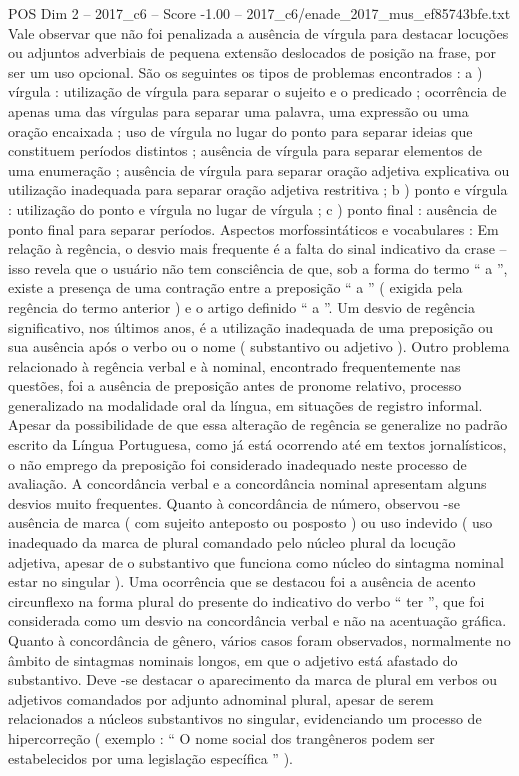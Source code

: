 \begin{textsample}{POS Dim 2 – 2017\_c6 – Score -1.00 – 2017\_c6/enade\_2017\_mus\_ef85743bfe.txt}
Vale observar que não foi penalizada a ausência de vírgula para destacar locuções ou adjuntos adverbiais de pequena extensão deslocados de posição na frase, por ser um uso opcional.
São os seguintes os tipos de problemas encontrados : a ) vírgula : utilização de vírgula para separar o sujeito e o predicado ; ocorrência de apenas uma das vírgulas para separar uma palavra, uma expressão ou uma oração encaixada ; uso de vírgula no lugar do ponto para separar ideias que constituem períodos distintos ; ausência de vírgula para separar elementos de uma enumeração ; ausência de vírgula para separar oração adjetiva explicativa ou utilização inadequada para separar oração adjetiva restritiva ; b ) ponto e vírgula : utilização do ponto e vírgula no lugar de vírgula ; c ) ponto final : ausência de ponto final para separar períodos.
Aspectos morfossintáticos e vocabulares : Em relação à regência, o desvio mais frequente é a falta do sinal indicativo da crase – isso revela que o usuário não tem consciência de que, sob a forma do termo “ a ”, existe a presença de uma contração entre a preposição “ a ” ( exigida pela regência do termo anterior ) e o artigo definido “ a ”.
Um desvio de regência significativo, nos últimos anos, é a utilização inadequada de uma preposição ou sua ausência após o verbo ou o nome ( substantivo ou adjetivo ).
Outro problema relacionado à regência verbal e à nominal, encontrado frequentemente nas questões, foi a ausência de preposição antes de pronome relativo, processo generalizado na modalidade oral da língua, em situações de registro informal.
Apesar da possibilidade de que essa alteração de regência se generalize no padrão escrito da Língua Portuguesa, como já está ocorrendo até em textos jornalísticos, o não emprego da preposição foi considerado inadequado neste processo de avaliação.
A concordância verbal e a concordância nominal apresentam alguns desvios muito frequentes.
Quanto à concordância de número, observou -se ausência de marca ( com sujeito anteposto ou posposto ) ou uso indevido ( uso inadequado da marca de plural comandado pelo núcleo plural da locução adjetiva, apesar de o substantivo que funciona como núcleo do sintagma nominal estar no singular ).
Uma ocorrência que se destacou foi a ausência de acento circunflexo na forma plural do presente do indicativo do verbo “ ter ”, que foi considerada como um desvio na concordância verbal e não na acentuação gráfica.
Quanto à concordância de gênero, vários casos foram observados, normalmente no âmbito de sintagmas nominais longos, em que o adjetivo está afastado do substantivo.
Deve -se destacar o aparecimento da marca de plural em verbos ou adjetivos comandados por adjunto adnominal plural, apesar de serem relacionados a núcleos substantivos no singular, evidenciando um processo de hipercorreção ( exemplo : “ O nome social dos trangêneros podem ser estabelecidos por uma legislação específica ” ).

\end{textsample}
